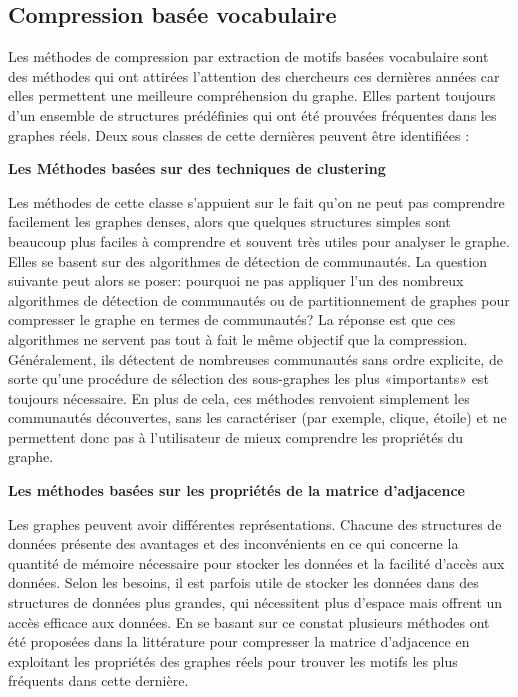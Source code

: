 \documentclass[a4paper,oneside,12pt]{report}
\theoremstyle{definition}
\begin{document}
				\subsection{Compression basée vocabulaire}
				\label{vog_desc}
				Les méthodes de compression par extraction de motifs basées vocabulaire sont des méthodes qui ont attirées l'attention des chercheurs ces dernières années car elles permettent une meilleure compréhension du graphe. Elles partent toujours d'un ensemble de structures prédéfinies qui ont été prouvées fréquentes dans les graphes réels. Deux sous classes de cette dernières peuvent être identifiées :
				 
					 \textbf{Les Méthodes basées sur des techniques de clustering}
							
							Les méthodes de cette classe s'appuient sur le fait qu'on ne peut pas comprendre facilement les graphes denses, alors que quelques structures simples sont beaucoup plus faciles à comprendre et souvent très utiles pour analyser le graphe. Elles se basent sur des algorithmes de détection de communautés. 
							La question suivante peut alors se poser: pourquoi ne pas appliquer l'un des nombreux algorithmes de détection de communautés ou de partitionnement de graphes pour compresser le graphe en termes de communautés? La réponse est que ces algorithmes ne servent pas tout à fait le même objectif que la compression. Généralement, ils détectent de nombreuses communautés sans ordre explicite, de sorte qu'une procédure de sélection des sous-graphes les plus «importants» est toujours nécessaire. En plus de cela, ces méthodes renvoient simplement les communautés découvertes, sans les caractériser (par exemple, clique, étoile) et ne permettent donc pas à l'utilisateur de mieux comprendre les propriétés du graphe. 
							
							
							
							
							
							
			\newpage
					 \textbf{Les méthodes basées sur les propriétés de la matrice d'adjacence}
							
							Les graphes peuvent avoir différentes représentations. Chacune des structures de données présente des avantages et des inconvénients en ce qui concerne la quantité de mémoire nécessaire pour stocker les données et la facilité d'accès aux données. Selon les besoins, il est parfois utile de stocker les données dans des structures de données plus grandes, qui nécessitent plus d'espace mais offrent un accès efficace aux données. En se basant sur ce constat plusieurs méthodes ont été  proposées dans la littérature pour compresser la matrice d'adjacence en exploitant les propriétés des graphes réels pour trouver les motifs les plus fréquents dans cette dernière.
							
\end{document}
